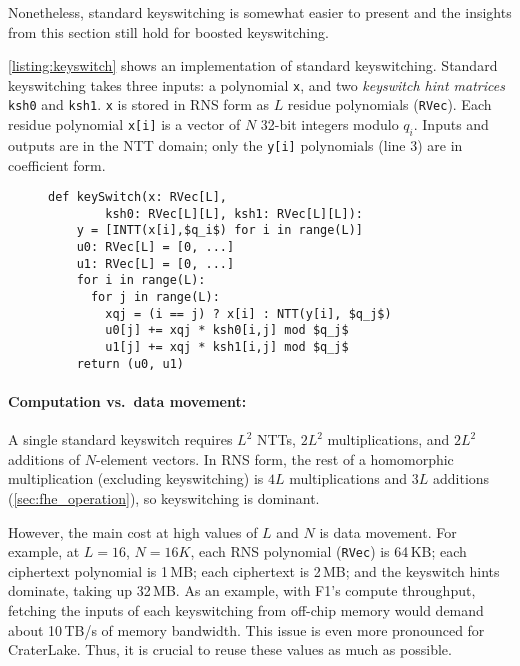 Nonetheless, standard keyswitching is somewhat easier to present and the
insights from this section still hold for boosted keyswitching.

\autoref{listing:keyswitch} shows an implementation of standard keyswitching.
Standard keyswitching takes three inputs: a polynomial \texttt{x}, and two
\emph{keyswitch hint matrices} \texttt{ksh0} and \texttt{ksh1}. \texttt{x} is
stored in RNS form as $L$ residue polynomials (\texttt{RVec}). Each residue
polynomial \texttt{x[i]} is a vector of $N$ 32-bit integers modulo $q_i$.
Inputs and outputs are in the NTT domain; only the \texttt{y[i]} polynomials
(line 3) are in coefficient form.


\begin{figure}
\begin{center}
  \begin{lstlisting}[caption={Standard keyswitch implementation. \texttt{RVec} is an $N$-element vector of 32-bit values, storing a single RNS polynomial in either the coefficient or the NTT domain.
    }, mathescape=true, style=custompython, label=listing:keyswitch]
  def keySwitch(x: RVec[L],
        ksh0: RVec[L][L], ksh1: RVec[L][L]):
    y = [INTT(x[i],$q_i$) for i in range(L)]
    u0: RVec[L] = [0, ...]
    u1: RVec[L] = [0, ...]
    for i in range(L):
      for j in range(L):
        xqj = (i == j) ? x[i] : NTT(y[i], $q_j$)
        u0[j] += xqj * ksh0[i,j] mod $q_j$
        u1[j] += xqj * ksh1[i,j] mod $q_j$
    return (u0, u1)
  \end{lstlisting}
\end{center}
\end{figure}

\paragraph{Computation vs.\ data movement:}
A single standard keyswitch requires $L^2$ NTTs, $2L^2$ multiplications, and
$2L^2$ additions of $N$-element \mbox{vectors}. In RNS form, the rest of a
homomorphic multiplication (excluding keyswitching) is $4L$ multiplications and
$3L$ additions (\autoref{sec:fhe_operation}), so keyswitching is dominant.

However, the main cost at high values of $L$ and $N$ is data movement. For
example, at $L = 16$, $N = 16K$, each RNS polynomial (\texttt{RVec}) is 64\,KB;
each ciphertext polynomial is 1\,MB; each ciphertext is 2\,MB; and the
keyswitch hints dominate, taking up 32\,MB. As an example, with F1's compute
throughput, fetching the inputs of each keyswitching from off-chip memory would
demand about 10\,TB/s of memory bandwidth. This issue is even more pronounced
for CraterLake. Thus, it is crucial to reuse these values as much as possible.


